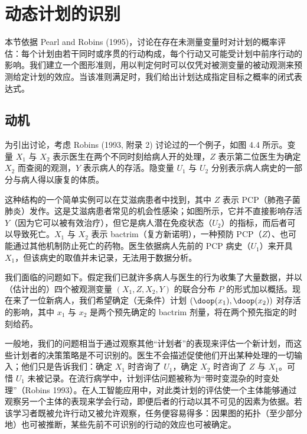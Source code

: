 \section{动态计划的识别}

本节依据 Pearl and Robins (1995)，讨论在存在未测量变量时对计划的概率评估：每个计划由若干同时或序贯的行动构成，每个行动又可能受计划中前序行动的影响。我们建立一个图形准则，用以判定何时可以仅凭对被测变量的被动观测来预测给定计划的效应。当该准则满足时，我们给出计划达成指定目标之概率的闭式表达式。

\subsection{动机}

为引出讨论，考虑 Robins (1993, 附录 2) 讨论过的一个例子，如图 4.4 所示。变量 $X_1$ 与 $X_2$ 表示医生在两个不同时刻给病人开的处理，$Z$ 表示第二位医生为确定 $X_2$ 而查阅的观测，$Y$ 表示病人的存活。隐变量 $U_1$ 与 $U_2$ 分别表示病人病史的一部分与病人得以康复的体质。

这种结构的一个简单实例可以在艾滋病患者中找到，其中 $Z$ 表示 PCP（肺孢子菌肺炎）发作。这是艾滋病患者常见的机会性感染；如图所示，它并不直接影响存活 $Y$（因为它可以被有效治疗），但它是病人潜在免疫状态（$U_2$）的指标，而后者可以导致死亡。$X_1$ 与 $X_2$ 表示 bactrim（复方新诺明），一种预防 PCP（$Z$）、也可能通过其他机制防止死亡的药物。医生依据病人先前的 PCP 病史（$U_1$）来开具 $X_1$，但该病史的取值并未记录，无法用于数据分析。

我们面临的问题如下。假定我们已就许多病人与医生的行为收集了大量数据，并以（估计出的）四个被观测变量 $(X_1,Z,X_2,Y)$ 的联合分布 $P$ 的形式加以概括。现在来了一位新病人，我们希望确定（无条件）计划 $(\doop(x_1),\doop(x_2))$ 对存活的影响，其中 $x_1$ 与 $x_2$ 是两个预先确定的 bactrim 剂量，将在两个预先指定的时刻给药。

一般地，我们的问题相当于通过观察其他“计划者”的表现来评估一个新计划，而这些计划者的决策策略是不可识别的。医生不会描述促使他们开出某种处理的一切输入；他们只是告诉我们：确定 $X_1$ 时咨询了 $U_1$，确定 $X_2$ 时咨询了 $Z$ 与 $X_1$。可惜 $U_1$ 未被记录。在流行病学中，计划评估问题被称为“带时变混杂的时变处理”（Robins 1993）。在人工智能应用中，对此类计划的评估使一个主体能够通过观察另一个主体的表现来学会行动，即便后者的行动以其不可见的因素为依据。若该学习者既被允许行动又被允许观察，任务便容易得多：因果图的拓扑（至少部分地）也可被推断，某些先前不可识别的行动的效应也可被确定。

